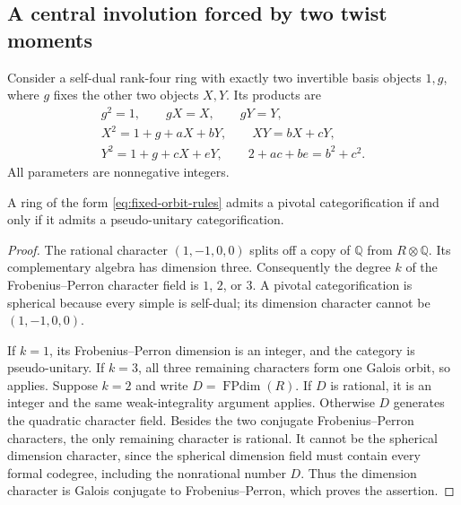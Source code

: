 \subsection{A central involution forced by two twist moments}
\label{sec:unbounded-fixed-orbits}
Consider a self-dual rank-four ring with exactly two invertible basis
objects $1,g$, where $g$ fixes the other two objects $X,Y$. Its products are
\begin{equation}\label{eq:fixed-orbit-rules}
\begin{gathered}
 g^2=1,\qquad gX=X,\qquad gY=Y,\\
 X^2=1+g+aX+bY,\qquad XY=bX+cY,\\
 Y^2=1+g+cX+eY,
 \qquad 2+ac+be=b^2+c^2.
\end{gathered}
\end{equation}
All parameters are nonnegative integers.

\begin{lemma}\label{lem:fixed-orbits-galois}
A ring of the form \eqref{eq:fixed-orbit-rules} admits a pivotal
categorification if and only if it admits a pseudo-unitary categorification.
\end{lemma}
\begin{proof}
The rational character $(1,-1,0,0)$ splits off a copy of $\mathbb Q$ from
$R\otimes\mathbb Q$. Its complementary algebra has dimension three.
Consequently the degree $k$ of the Frobenius--Perron character field is
$1$, $2$, or $3$. A pivotal categorification is spherical because every
simple is self-dual; its dimension character cannot be $(1,-1,0,0)$.

If $k=1$, its Frobenius--Perron dimension is an integer, and the category is
pseudo-unitary. If $k=3$, all three remaining characters form one Galois
orbit, so \cite[Lemma~\ref{B-lem:galois}]{Finite} applies. Suppose $k=2$ and write
$D=\operatorname{FPdim}(R)$. If $D$ is rational, it is an integer and the
same weak-integrality argument applies. Otherwise $D$ generates the
quadratic character field. Besides the two conjugate Frobenius--Perron
characters, the only remaining character is rational. It cannot be the
spherical dimension character, since the spherical dimension field must
contain every formal codegree, including the nonrational number $D$.
Thus the dimension character is Galois conjugate to Frobenius--Perron,
which proves the assertion.
\end{proof}

